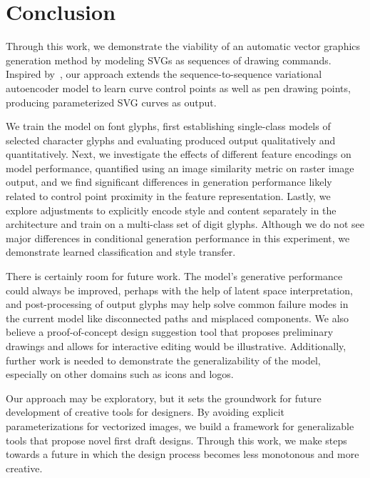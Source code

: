 \chapter{Conclusion}
Through this work, we demonstrate the viability of an automatic vector graphics generation method by modeling SVGs as sequences of drawing commands.
Inspired by~\cite{ha2017neural}, our approach extends the sequence-to-sequence variational autoencoder model to learn curve control points as well as pen drawing points, producing parameterized SVG curves as output.

We train the model on font glyphs, first establishing single-class models of selected character glyphs and evaluating produced output qualitatively and quantitatively.
Next, we investigate the effects of different feature encodings on model performance, quantified using an image similarity metric on raster image output, and we find significant differences in generation performance likely related to control point proximity in the feature representation.
Lastly, we explore adjustments to explicitly encode style and content separately in the architecture and train on a multi-class set of digit glyphs.
Although we do not see major differences in conditional generation performance in this experiment, we demonstrate learned classification and style transfer.

There is certainly room for future work.
The model's generative performance could always be improved, perhaps with the help of latent space interpretation, and post-processing of output glyphs may help solve common failure modes in the current model like disconnected paths and misplaced components.
We also believe a proof-of-concept design suggestion tool that proposes preliminary drawings and allows for interactive editing would be illustrative.
Additionally, further work is needed to demonstrate the generalizability of the model, especially on other domains such as icons and logos.

Our approach may be exploratory, but it sets the groundwork for future development of creative tools for designers.
By avoiding explicit parameterizations for vectorized images, we build a framework for generalizable tools that propose novel first draft designs.
Through this work, we make steps towards a future in which the design process becomes less monotonous and more creative.
